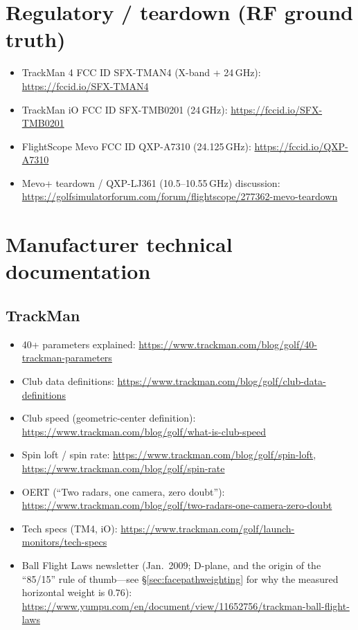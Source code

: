 \section{Regulatory / teardown (RF ground truth)}
\begin{itemize}\small
\item TrackMan 4 FCC ID SFX-TMAN4 (X-band + 24\,GHz):
  \url{https://fccid.io/SFX-TMAN4}
\item TrackMan iO FCC ID SFX-TMB0201 (24\,GHz):
  \url{https://fccid.io/SFX-TMB0201}
\item FlightScope Mevo FCC ID QXP-A7310 (24.125\,GHz):
  \url{https://fccid.io/QXP-A7310}
\item Mevo+ teardown / QXP-LJ361 (10.5--10.55\,GHz) discussion:
  \url{https://golfsimulatorforum.com/forum/flightscope/277362-mevo-teardown}
\end{itemize}

\section{Manufacturer technical documentation}

\subsection*{TrackMan}
\begin{itemize}\small
\item 40+ parameters explained:
  \url{https://www.trackman.com/blog/golf/40-trackman-parameters}
\item Club data definitions:
  \url{https://www.trackman.com/blog/golf/club-data-definitions}
\item Club speed (geometric-center definition):
  \url{https://www.trackman.com/blog/golf/what-is-club-speed}
\item Spin loft / spin rate:
  \url{https://www.trackman.com/blog/golf/spin-loft},
  \url{https://www.trackman.com/blog/golf/spin-rate}
\item OERT (``Two radars, one camera, zero doubt''):
  \url{https://www.trackman.com/blog/golf/two-radars-one-camera-zero-doubt}
\item Tech specs (TM4, iO):
  \url{https://www.trackman.com/golf/launch-monitors/tech-specs}
\item Ball Flight Laws newsletter (Jan.\ 2009; D-plane, and the origin of
  the ``85/15'' rule of thumb---see \S\ref{sec:facepathweighting} for why
  the measured horizontal weight is $0.76$):
  \url{https://www.yumpu.com/en/document/view/11652756/trackman-ball-flight-laws}
\end{itemize}

